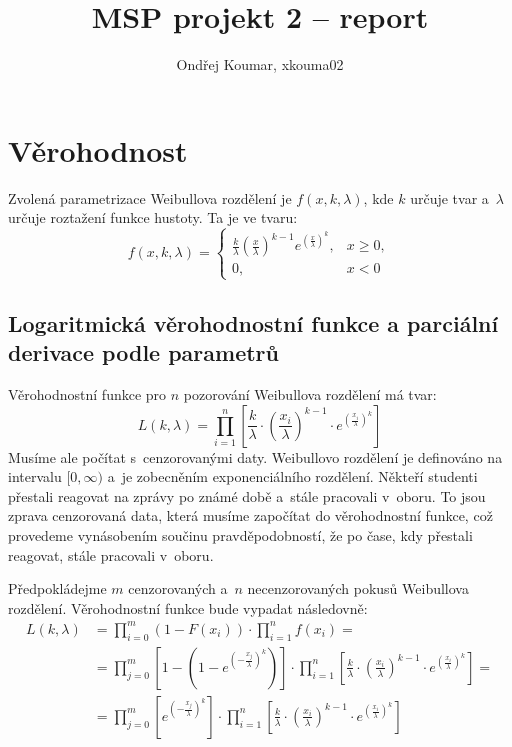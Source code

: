 \documentclass[a4paper, 11pt]{article}
\title{MSP projekt 2 -- report}
\author{Ondřej Koumar, xkouma02}
\date{}
\begin{document}
\maketitle

\vspace{-3em}

\section{Věrohodnost}

Zvolená parametrizace Weibullova rozdělení je $f(x, k, \lambda)$, kde $k$ určuje tvar a~$\lambda$ určuje roztažení funkce hustoty. Ta je ve tvaru:
\[
    f(x, k, \lambda) = 
    \begin{cases}
        \frac{k}{\lambda} \left( \frac{x}{\lambda} \right)^{k-1} e^{\left( \frac{x}{\lambda} \right)^{k}}, & x\geq 0, \\
        0, & x < 0
    \end{cases}
\]

\subsection{Logaritmická věrohodnostní funkce a parciální derivace podle parametrů}
Věrohodnostní funkce pro $n$ pozorování Weibullova rozdělení má tvar:
\[
    L(k, \lambda) = \prod_{i=1}^{n} \left[ \frac{k}{\lambda} \cdot \left( \frac{x_{i}}{\lambda} \right)^{k-1} \cdot e^{\left( \frac{x_{i}}{\lambda}\right)^{k}} \right]
\]
Musíme ale počítat s~cenzorovanými daty.
Weibullovo rozdělení je definováno na intervalu $[0, \infty)$ a~je zobecněním exponenciálního rozdělení.
Někteří studenti přestali reagovat na zprávy po známé době a~stále pracovali v~oboru.
To jsou zprava cenzorovaná data, která musíme započítat do věrohodnostní funkce, což provedeme vynásobením součinu pravděpodobností, že po čase, kdy přestali reagovat, stále pracovali v~oboru.

Předpokládejme $m$ cenzorovaných a~$n$ necenzorovaných pokusů Weibullova rozdělení.
Vě\-ro\-hod\-nost\-ní funkce bude vypadat následovně:
\begin{align*}
    L(k, \lambda) &= \prod_{i=0}^{m}\left(1 - F(x_i)\right) \cdot \prod_{i=1}^{n} f(x_i) = \\
    &= \prod_{j=0}^{m} \left[1 - \left( 1 - e^{\left( -\frac{x_j}{\lambda} \right) ^k} \right) \right] \cdot \prod_{i=1}^{n} \left[ \frac{k}{\lambda} \cdot \left( \frac{x_{i}}{\lambda} \right)^{k-1} \cdot e^{\left( \frac{x_{i}}{\lambda}\right)^{k}} \right] = \\
    &= \prod_{j=0}^{m} \left[ e^{\left( -\frac{x_j}{\lambda} \right) ^k} \right] \cdot \prod_{i=1}^{n} \left[ \frac{k}{\lambda} \cdot \left( \frac{x_{i}}{\lambda} \right)^{k-1} \cdot e^{\left( \frac{x_{i}}{\lambda}\right)^{k}} \right] \\
\end{align*}
\end{document}
